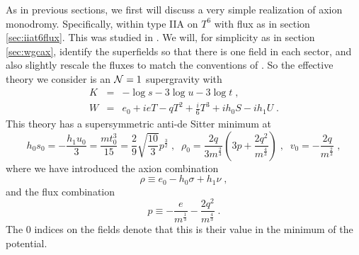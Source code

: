 \documentclass[11pt,a4paper]{article}
\numberwithin{equation}{section}
\numberwithin{table}{section}\setlength{\multlinegap}{25pt}
\newcommand{\bea}{\begin{eqnarray}}  \newcommand{\eea}{\end{eqnarray}}
\newcommand{\nn}{\nonumber}
\newcommand{\be}{\begin{equation}}
\newcommand{\ee}{\end{equation}}
\begin{document}
{As in previous sections, we first will discuss a very simple realization of axion monodromy. Specifically, within type IIA on $T^6$ with flux as in section \ref{sec:iiat6flux}. This was studied in \cite{Baume:2016psm}. We will, for simplicity as in section \ref{sec:wgcax}, identify the superfields so that there is one field in each sector, and also slightly rescale the fluxes to match the conventions of \cite{Baume:2016psm}. So the effective theory we consider is an ${\cal N}=1$ supergravity with 
\bea
K &=& - \log s - 3 \log u -3 \log t \;,  \\  \nn
W &=&  e_0 + i e T - q T^2 + \frac{i}{6} T^3 + i h_0 S - i h_1 U \;.
\label{simaxmoniia}
\eea
This theory has a supersymmetric anti-de Sitter minimum at
\be
h_0 s_0 = -\frac{h_1 u_0}{3} = \frac{m t_0^3}{15} = \frac{2}{9}\sqrt{\frac{10}{3}} p^{\frac32}\;,\;\; \rho_0 = \frac{2q}{3m^{\frac23}} \left(3 p + \frac{2q^2}{m^{\frac43}} \right) \;,\;\; v_0 = - \frac{2q}{m^{\frac23}} \;,
\ee
where we have introduced the axion combination 
\be
\rho \equiv e_0 - h_0 \sigma + h_1 \nu \;,
\label{rhodef}
\ee
and the flux combination
\be
p \equiv - \frac{e}{m^{\frac13}} - \frac{2q^2}{m^{\frac43}} \;.
\ee
The $0$ indices on the fields denote that this is their value in the minimum of the potential. 

}
\end{document}
